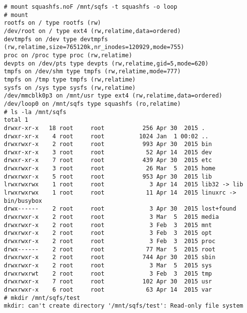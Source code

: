 \begin{lstlisting}[style=Bash,caption=squashfs.noF]
# mount squashfs.noF /mnt/sqfs -t squashfs -o loop
# mount
rootfs on / type rootfs (rw)
/dev/root on / type ext4 (rw,relatime,data=ordered)
devtmpfs on /dev type devtmpfs (rw,relatime,size=765120k,nr_inodes=120929,mode=755)
proc on /proc type proc (rw,relatime)
devpts on /dev/pts type devpts (rw,relatime,gid=5,mode=620)
tmpfs on /dev/shm type tmpfs (rw,relatime,mode=777)
tmpfs on /tmp type tmpfs (rw,relatime)
sysfs on /sys type sysfs (rw,relatime)
/dev/mmcblk0p3 on /mnt/usr type ext4 (rw,relatime,data=ordered)
/dev/loop0 on /mnt/sqfs type squashfs (ro,relatime)
# ls -la /mnt/sqfs
total 1
drwxr-xr-x   18 root     root           256 Apr 30  2015 .
drwxr-xr-x    4 root     root          1024 Jan  1 00:02 ..
drwxrwxr-x    2 root     root           993 Apr 30  2015 bin
drwxr-xr-x    3 root     root            52 Apr 14  2015 dev
drwxr-xr-x    7 root     root           439 Apr 30  2015 etc
drwxrwxr-x    3 root     root            26 Mar  5  2015 home
drwxrwxr-x    5 root     root           953 Apr 30  2015 lib
lrwxrwxrwx    1 root     root             3 Apr 14  2015 lib32 -> lib
lrwxrwxrwx    1 root     root            11 Apr 14  2015 linuxrc -> bin/busybox
drwx------    2 root     root             3 Apr 30  2015 lost+found
drwxrwxr-x    2 root     root             3 Mar  5  2015 media
drwxrwxr-x    2 root     root             3 Feb  3  2015 mnt
drwxrwxr-x    2 root     root             3 Feb  3  2015 opt
drwxrwxr-x    2 root     root             3 Feb  3  2015 proc
drwx------    2 root     root            77 Mar  5  2015 root
drwxrwxr-x    2 root     root           744 Apr 30  2015 sbin
drwxrwxr-x    2 root     root             3 Mar  5  2015 sys
drwxrwxrwt    2 root     root             3 Feb  3  2015 tmp
drwxrwxr-x    7 root     root           102 Apr 30  2015 usr
drwxrwxr-x    6 root     root            63 Apr 14  2015 var
# mkdir /mnt/sqfs/test
mkdir: can't create directory '/mnt/sqfs/test': Read-only file system
\end{lstlisting}

